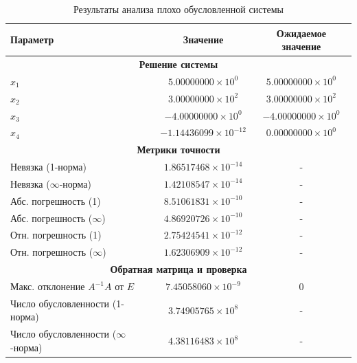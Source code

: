 \documentclass[12pt, a4paper]{article}
\begin{document}
\begin{table}[h]
\centering
\caption{Результаты анализа плохо обусловленной системы}
\begin{tabular}{|l|c|c|}
\hline
\textbf{Параметр} & \textbf{Значение} & \textbf{Ожидаемое значение} \\
\hline
\multicolumn{3}{|c|}{\textbf{Решение системы}} \\
\hline
$x_1$ & $5.00000000 \times 10^0$ & $5.00000000 \times 10^0$ \\
$x_2$ & $3.00000000 \times 10^2$ & $3.00000000 \times 10^2$ \\
$x_3$ & $-4.00000000 \times 10^0$ & $-4.00000000 \times 10^0$ \\
$x_4$ & $-1.14436099 \times 10^{-12}$ & $0.00000000 \times 10^0$ \\
\hline
\multicolumn{3}{|c|}{\textbf{Метрики точности}} \\
\hline
Невязка (1-норма) & $1.86517468 \times 10^{-14}$ & - \\
Невязка ($\infty$-норма) & $1.42108547 \times 10^{-14}$ & - \\
Абс. погрешность (1) & $8.51061831 \times 10^{-10}$ & - \\
Абс. погрешность ($\infty$) & $4.86920726 \times 10^{-10}$ & - \\
Отн. погрешность (1) & $2.75424541 \times 10^{-12}$ & - \\
Отн. погрешность ($\infty$) & $1.62306909 \times 10^{-12}$ & - \\
\hline
\multicolumn{3}{|c|}{\textbf{Обратная матрица и проверка}} \\
\hline
Макс. отклонение $A^{-1}A$ от $E$& $7.45058060 \times 10^{-9}$ & 0 \\
Число обусловленности (1-норма) & $3.74905765 \times 10^8$ & - \\
Число обусловленности ($\infty$-норма) & $4.38116483 \times 10^8$ & - \\
\hline
\end{tabular}
\end{table}
\end{document}

